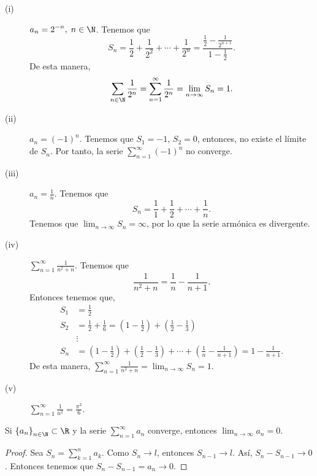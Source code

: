 \begin{eg}
\normalfont 
\begin{description}
\item[(i)] $\displaystyle a_{n} = 2^{-n}, \; n \in \N $. Tenemos que 
\[S_{n} = \frac{1}{2} + \frac{1}{2^{2}} + \cdots + \frac{1}{2^{n}} = \frac{\frac{1}{2}-\frac{1}{2^{n+1}}}{1 -\frac{1}{2}} .\]
De esta manera, 
\[\sum_{n\in\N}\frac{1}{2^{n}} = \sum^{\infty}_{n=1}\frac{1}{2^{n}} = \lim_{n \to \infty}S_{n} = 1 .\]
\item[(ii)] $\displaystyle a_{n} = \left(-1\right)^{n} $. Tenemos que $\displaystyle S_{1} = -1 $, $\displaystyle S_{2}= 0 $, entonces, no existe el límite de $\displaystyle S_{n} $. Por tanto, la serie $\displaystyle \sum^{\infty}_{n=1}\left(-1\right)^{n} $ no converge.
\item[(iii)] $\displaystyle a_{n} = \frac{1}{n} $. Tenemos que 
	\[S_{n} = \frac{1}{1} + \frac{1}{2} + \cdots + \frac{1}{n} .\]
Tenemos que $\displaystyle \lim_{n \to \infty}S_{n} = \infty $, por lo que la serie armónica es divergente.
\item[(iv)] $\displaystyle \sum^{\infty}_{n = 1}\frac{1}{n^{2}+n} $. Tenemos que 
	\[\frac{1}{n^{2}+n} = \frac{1}{n} -\frac{1}{n+1} .\]
Entonces tenemos que, 
\[
\begin{split}
	S_{1} & = \frac{1}{2} \\
	S_{2} & = \frac{1}{2} + \frac{1}{6} = \left(1 - \frac{1}{2}\right) + \left(\frac{1}{2} - \frac{1}{3}\right) \\
& \vdots \\
	S_{n} & = \left(1 - \frac{1}{2}\right) + \left(\frac{1}{2} - \frac{1}{3}\right) + \cdots + \left(\frac{1}{n}-\frac{1}{n+1}\right) = 1 - \frac{1}{n+1}.
\end{split}
\]
De esta manera, $\displaystyle \sum^{\infty}_{n = 1}\frac{1}{n^{2}+n} = \lim_{n \to \infty}S_{n} = 1 $.
\item[(v)] $\displaystyle \sum^{\infty}_{n = 1} \frac{1}{n^{2}} = \frac{\pi^{2}}{6} $.
\end{description}
\end{eg}

\begin{ftheorem}[]
	\normalfont Si $\displaystyle \left\{ a_{n}\right\} _{n\in\N}\subset\R $ y la serie $\displaystyle \sum^{\infty}_{n = 1}a_{n} $ converge, entonces $\displaystyle \lim_{n \to \infty}a_{n} = 0 $.
\end{ftheorem}

\begin{proof}
Sea $\displaystyle S_{n} = \sum^{n}_{k=1}a_{k} $. Como $\displaystyle S_{n} \to l $, entonces $\displaystyle S_{n-1} \to l $. Así, $\displaystyle S_{n}-S_{n-1} \to 0 $. Entonces tenemos que $\displaystyle S_{n}-S_{n-1} = a_{n} \to 0 $. 
\end{proof}

